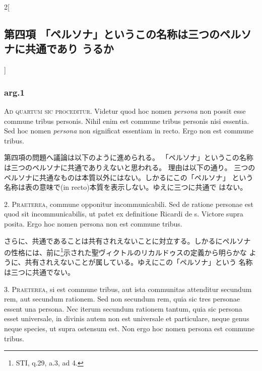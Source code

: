 \documentclass[paper=a4paper,fontsize=10pt,jafontsize=9pt,titlepage]{jlreq}
\begin{document}
\begin{paracol}{2}[\subsection{第四項 「ペルソナ」というこの名称は三つのペルソナに共通であり うるか}]

\subsubsection{arg.1}

{\scshape Ad quartum sic proceditur}. Videtur quod hoc nomen {\itshape persona} non possit
esse commune tribus personis. Nihil enim est commune tribus personis
nisi essentia. Sed hoc nomen {\itshape persona} non significat essentiam in
recto. Ergo non est commune tribus.


\switchcolumn


第四項の問題へ議論は以下のように進められる。
「ペルソナ」というこの名称は三つのペルソナに共通でありえないと思われる。
 理由は以下の通り。
三つのペルソナに共通なものは本質以外にはない。しかるにこの「ペルソナ」
 という名称は表の意味で(in recto)本質を表示しない。ゆえに三つに共通で
 はない。




2. {\scshape Praeterea}, commune opponitur incommunicabili. Sed de ratione personae
est quod sit incommunicabilis, ut patet ex definitione Ricardi de
s. Victore supra posita. Ergo hoc nomen persona non est commune
tribus.


\switchcolumn


さらに、共通であることは共有されえないことに対立する。しかるにペルソナ
 の性格には、前に\footnote{STI, q.29, a.3, ad 4.}示された聖ヴィクトルのリカルドゥスの定義から明らかな
 ように、共有されえないことが属している。ゆえにこの「ペルソナ」という
 名称は三つに共通でない。




3. {\scshape Praeterea}, si est commune tribus, aut ista communitas attenditur
secundum rem, aut secundum rationem. Sed non secundum rem, quia sic
tres personae essent una persona. Nec iterum secundum rationem tantum,
quia sic persona esset universale, in divinis autem non est universale
et particulare, neque genus neque species, ut supra ostensum est. Non
ergo hoc nomen persona est commune tribus.



\end{paracol}
\end{document}
